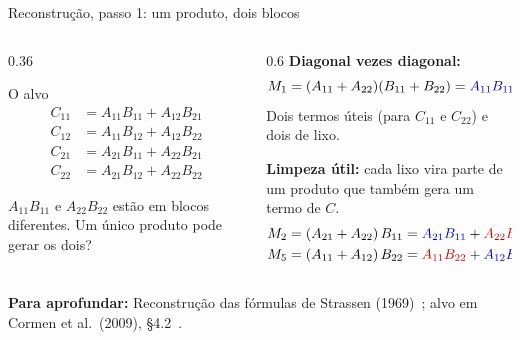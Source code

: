 \documentclass[aspectratio=169,xcolor=table]{beamer}
\newcommand{\fonte}[1]{%
  \vfill
  {\tiny\color{gray!55!black}\textbf{Para aprofundar:} #1\par}%
}
\newcommand{\util}[1]{\textcolor{blue!70!black}{#1}}
\newcommand{\lixo}[1]{\textcolor{red!75!black}{#1}}
\begin{document}
\begin{frame}{Reconstrução, passo 1: um produto, dois blocos}
  \begin{columns}[T]
    \begin{column}{0.36\textwidth}
      \begin{block}{O alvo}
        \scriptsize
        \vspace{-4pt}
        \[
          \begin{aligned}
            C_{11} &= A_{11}B_{11} + A_{12}B_{21}\\
            C_{12} &= A_{11}B_{12} + A_{12}B_{22}\\
            C_{21} &= A_{21}B_{11} + A_{22}B_{21}\\
            C_{22} &= A_{21}B_{12} + A_{22}B_{22}
          \end{aligned}
        \]
      \end{block}
      \scriptsize $A_{11}B_{11}$ e $A_{22}B_{22}$ estão em blocos diferentes.
      Um único produto pode gerar os dois?
    \end{column}
    \begin{column}{0.6\textwidth}
      \scriptsize
      \textbf{Diagonal vezes diagonal:}
      \[
        M_1 = (A_{11}+A_{22})(B_{11}+B_{22})
        = \util{A_{11}B_{11}} + \lixo{A_{11}B_{22}} + \lixo{A_{22}B_{11}} + \util{A_{22}B_{22}}
      \]
      Dois termos \util{úteis} (para $C_{11}$ e $C_{22}$) e dois de \lixo{lixo}.
      \medskip

      \textbf{Limpeza útil:} cada lixo vira parte de um produto que também gera um termo de $C$.
      \[
        \begin{aligned}
          M_2 &= (A_{21}+A_{22})\,B_{11} = \util{A_{21}B_{11}} + \lixo{A_{22}B_{11}}
            &&\text{útil para } C_{21}\\
          M_5 &= (A_{11}+A_{12})\,B_{22} = \lixo{A_{11}B_{22}} + \util{A_{12}B_{22}}
            &&\text{útil para } C_{12}
        \end{aligned}
      \]
    \end{column}
  \end{columns}
  \fonte{Reconstrução das fórmulas de Strassen (1969)~\cite{strassen1969gaussian};
    alvo em Cormen et al.\ (2009), \S 4.2~\cite{cormen2009introduction}.}
\end{frame}
\end{document}
